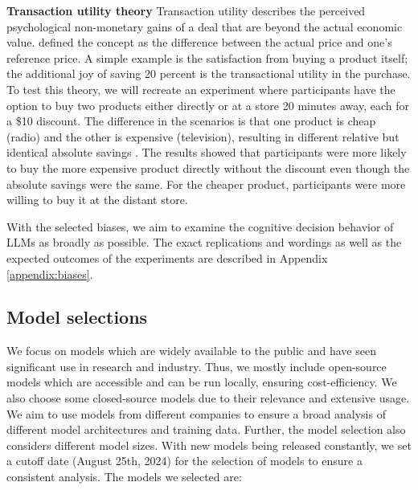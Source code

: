 \par \textbf{Transaction utility theory} Transaction utility describes the perceived psychological non-monetary gains of a deal that are beyond the actual economic value. \textcite{thaler1983transaction} defined the concept as the difference between the actual price and one's reference price. A simple example is the satisfaction from buying a product itself; the additional joy of saving 20 percent is the transactional utility in the purchase. To test this theory, we will recreate an experiment where participants have the option to buy two products either directly or at a store 20 minutes away, each for a \$10 discount. The difference in the scenarios is that one product is cheap (radio) and the other is expensive (television), resulting in different relative but identical absolute savings \parencite{thaler1983transaction}. The results showed that participants were more likely to buy the more expensive product directly without the discount even though the absolute savings were the same. For the cheaper product, participants were more willing to buy it at the distant store.

\setlength{\parindent}{0pt}
\par With the selected biases, we aim to examine the cognitive decision behavior of LLMs as broadly as possible. The exact replications and wordings as well as the expected outcomes of the experiments are described in Appendix \ref{appendix:biases}.


\subsection{Model selections}
\par We focus on models which are widely available to the public and have seen significant use in research and industry. Thus, we mostly include open-source models which are accessible and can be run locally, ensuring cost-efficiency. We also choose some closed-source models due to their relevance and extensive usage. We aim to use models from different companies to ensure a broad analysis of different model architectures and training data. Further, the model selection also considers different model sizes. With new models being released constantly, we set a cutoff date (August 25th, 2024) for the selection of models to ensure a consistent analysis. The models we selected are:

